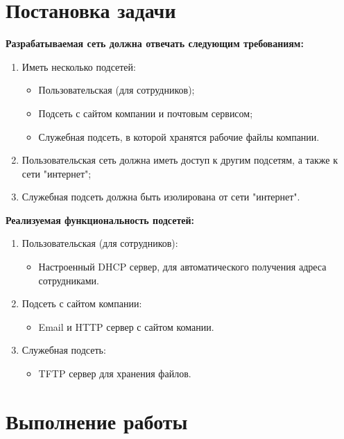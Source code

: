 \documentclass[14pt,a4paper,report]{report}
\begin{document}
\section{Постановка задачи}
\textbf{Разрабатываемая сеть должна отвечать следующим требованиям:}
\begin{enumerate}
\item Иметь несколько подсетей:
\begin{itemize}
\item Пользовательская (для сотрудников);
\item Подсеть с сайтом компании и почтовым сервисом;
\item Служебная подсеть, в которой хранятся рабочие файлы компании.
\end{itemize}
\item Пользовательская сеть должна иметь доступ к другим подсетям, а также к сети "интернет";
\item Служебная подсеть должна быть изолирована от сети "интернет".
\end{enumerate}
\textbf{Реализуемая функциональность подсетей:}
\begin{enumerate}
\item Пользовательская (для сотрудников):
\begin{itemize}
\item Настроенный DHCP сервер, для автоматического получения адреса сотрудниками.
\end{itemize}
\item Подсеть с сайтом компании:
\begin{itemize}
\item Email и HTTP сервер с сайтом комании.
\end{itemize}
\item Служебная подсеть:
\begin{itemize}
\item TFTP сервер для хранения файлов.
\end{itemize}
\end{enumerate}


\section{Выполнение работы}
\end{document}
